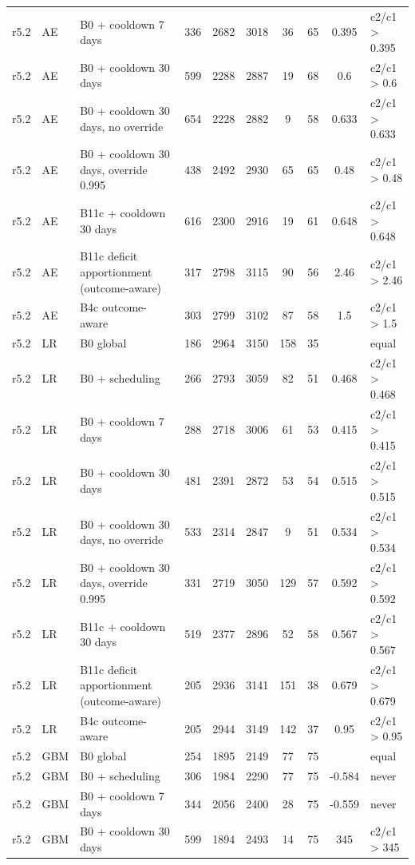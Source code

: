 \begin{longtable}{llp{4.6cm}ccccccl}
r5.2 & AE & B0 + cooldown 7 days & 336 & 2682 & 3018 & 36 & 65 & 0.395 & c2/c1 > 0.395 \\
r5.2 & AE & B0 + cooldown 30 days & 599 & 2288 & 2887 & 19 & 68 & 0.6 & c2/c1 > 0.6 \\
r5.2 & AE & B0 + cooldown 30 days, no override & 654 & 2228 & 2882 & 9 & 58 & 0.633 & c2/c1 > 0.633 \\
r5.2 & AE & B0 + cooldown 30 days, override 0.995 & 438 & 2492 & 2930 & 65 & 65 & 0.48 & c2/c1 > 0.48 \\
r5.2 & AE & B11c + cooldown 30 days & 616 & 2300 & 2916 & 19 & 61 & 0.648 & c2/c1 > 0.648 \\
r5.2 & AE & B11c deficit apportionment (outcome-aware) & 317 & 2798 & 3115 & 90 & 56 & 2.46 & c2/c1 > 2.46 \\
r5.2 & AE & B4c outcome-aware & 303 & 2799 & 3102 & 87 & 58 & 1.5 & c2/c1 > 1.5 \\
r5.2 & LR & B0 global & 186 & 2964 & 3150 & 158 & 35 &  & equal \\
r5.2 & LR & B0 + scheduling & 266 & 2793 & 3059 & 82 & 51 & 0.468 & c2/c1 > 0.468 \\
r5.2 & LR & B0 + cooldown 7 days & 288 & 2718 & 3006 & 61 & 53 & 0.415 & c2/c1 > 0.415 \\
r5.2 & LR & B0 + cooldown 30 days & 481 & 2391 & 2872 & 53 & 54 & 0.515 & c2/c1 > 0.515 \\
r5.2 & LR & B0 + cooldown 30 days, no override & 533 & 2314 & 2847 & 9 & 51 & 0.534 & c2/c1 > 0.534 \\
r5.2 & LR & B0 + cooldown 30 days, override 0.995 & 331 & 2719 & 3050 & 129 & 57 & 0.592 & c2/c1 > 0.592 \\
r5.2 & LR & B11c + cooldown 30 days & 519 & 2377 & 2896 & 52 & 58 & 0.567 & c2/c1 > 0.567 \\
r5.2 & LR & B11c deficit apportionment (outcome-aware) & 205 & 2936 & 3141 & 151 & 38 & 0.679 & c2/c1 > 0.679 \\
r5.2 & LR & B4c outcome-aware & 205 & 2944 & 3149 & 142 & 37 & 0.95 & c2/c1 > 0.95 \\
r5.2 & GBM & B0 global & 254 & 1895 & 2149 & 77 & 75 &  & equal \\
r5.2 & GBM & B0 + scheduling & 306 & 1984 & 2290 & 77 & 75 & -0.584 & never \\
r5.2 & GBM & B0 + cooldown 7 days & 344 & 2056 & 2400 & 28 & 75 & -0.559 & never \\
r5.2 & GBM & B0 + cooldown 30 days & 599 & 1894 & 2493 & 14 & 75 & 345 & c2/c1 > 345 \\

\end{longtable}
